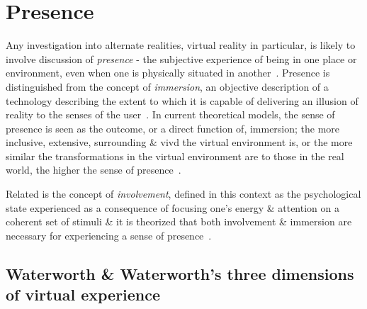

\section{Presence}
\label{lit-review-presencec}
Any investigation into alternate realities, virtual reality in particular, is likely to involve discussion of \textit{presence} - the subjective experience of being in one place or environment, even when one is physically situated in another~\cite{Witmer1998}. Presence is distinguished from the concept of \textit{immersion}, an objective description of a technology describing the extent to which it is capable of delivering an illusion of reality to the senses of the user~\cite{Slater1997}. In current theoretical models, the sense of presence is seen as the outcome, or a direct function of, immersion; the more inclusive, extensive, surrounding \& vivd the virtual environment is, or the more similar the transformations in the virtual environment are to those in the real world, the higher the sense of presence~\cite{Constantin2003}.

Related is the concept of \textit{involvement}, defined in this context as the psychological state experienced as a consequence of focusing one's energy \& attention on a coherent set of stimuli \& it is theorized that both involvement \& immersion are necessary for experiencing a sense of presence~\cite{Witmer1998}.

\subsection{Waterworth \& Waterworth's three dimensions of virtual experience}

\newcommand{\presencefootnote}{\footnote{\textbf{Presence} in the context of this model is defined as a state of heightened perceptual processing of environmental stimuli (\textit{``a psychological focus on direct perceptual processing''}~\cite{Waterworth2001}) accompanied by lessened conceptual reasoning, whether these environmental stimuli originate from a real environment, a virtual environment, a mixed reality environment, or even from multiple discrete environments.}}

\newcommand{\absencefootnote}{\footnote{\textbf{Absence} is defined as \textit{``a psychological focus on \ldots\ conceptual processing''}~\cite{Waterworth2001}.}}

